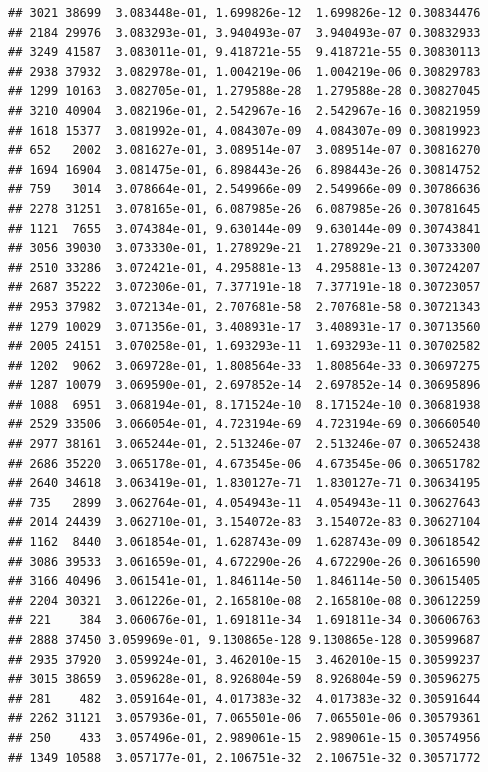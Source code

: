 \documentclass[
]{article}
\begin{document}
\begin{verbatim}
## 3021 38699  3.083448e-01, 1.699826e-12  1.699826e-12 0.30834476
## 2184 29976  3.083293e-01, 3.940493e-07  3.940493e-07 0.30832933
## 3249 41587  3.083011e-01, 9.418721e-55  9.418721e-55 0.30830113
## 2938 37932  3.082978e-01, 1.004219e-06  1.004219e-06 0.30829783
## 1299 10163  3.082705e-01, 1.279588e-28  1.279588e-28 0.30827045
## 3210 40904  3.082196e-01, 2.542967e-16  2.542967e-16 0.30821959
## 1618 15377  3.081992e-01, 4.084307e-09  4.084307e-09 0.30819923
## 652   2002  3.081627e-01, 3.089514e-07  3.089514e-07 0.30816270
## 1694 16904  3.081475e-01, 6.898443e-26  6.898443e-26 0.30814752
## 759   3014  3.078664e-01, 2.549966e-09  2.549966e-09 0.30786636
## 2278 31251  3.078165e-01, 6.087985e-26  6.087985e-26 0.30781645
## 1121  7655  3.074384e-01, 9.630144e-09  9.630144e-09 0.30743841
## 3056 39030  3.073330e-01, 1.278929e-21  1.278929e-21 0.30733300
## 2510 33286  3.072421e-01, 4.295881e-13  4.295881e-13 0.30724207
## 2687 35222  3.072306e-01, 7.377191e-18  7.377191e-18 0.30723057
## 2953 37982  3.072134e-01, 2.707681e-58  2.707681e-58 0.30721343
## 1279 10029  3.071356e-01, 3.408931e-17  3.408931e-17 0.30713560
## 2005 24151  3.070258e-01, 1.693293e-11  1.693293e-11 0.30702582
## 1202  9062  3.069728e-01, 1.808564e-33  1.808564e-33 0.30697275
## 1287 10079  3.069590e-01, 2.697852e-14  2.697852e-14 0.30695896
## 1088  6951  3.068194e-01, 8.171524e-10  8.171524e-10 0.30681938
## 2529 33506  3.066054e-01, 4.723194e-69  4.723194e-69 0.30660540
## 2977 38161  3.065244e-01, 2.513246e-07  2.513246e-07 0.30652438
## 2686 35220  3.065178e-01, 4.673545e-06  4.673545e-06 0.30651782
## 2640 34618  3.063419e-01, 1.830127e-71  1.830127e-71 0.30634195
## 735   2899  3.062764e-01, 4.054943e-11  4.054943e-11 0.30627643
## 2014 24439  3.062710e-01, 3.154072e-83  3.154072e-83 0.30627104
## 1162  8440  3.061854e-01, 1.628743e-09  1.628743e-09 0.30618542
## 3086 39533  3.061659e-01, 4.672290e-26  4.672290e-26 0.30616590
## 3166 40496  3.061541e-01, 1.846114e-50  1.846114e-50 0.30615405
## 2204 30321  3.061226e-01, 2.165810e-08  2.165810e-08 0.30612259
## 221    384  3.060676e-01, 1.691811e-34  1.691811e-34 0.30606763
## 2888 37450 3.059969e-01, 9.130865e-128 9.130865e-128 0.30599687
## 2935 37920  3.059924e-01, 3.462010e-15  3.462010e-15 0.30599237
## 3015 38659  3.059628e-01, 8.926804e-59  8.926804e-59 0.30596275
## 281    482  3.059164e-01, 4.017383e-32  4.017383e-32 0.30591644
## 2262 31121  3.057936e-01, 7.065501e-06  7.065501e-06 0.30579361
## 250    433  3.057496e-01, 2.989061e-15  2.989061e-15 0.30574956
## 1349 10588  3.057177e-01, 2.106751e-32  2.106751e-32 0.30571772

\end{verbatim}
\end{document}
